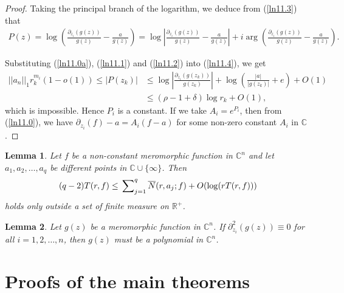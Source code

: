 \documentclass[11pt, reqno]{amsart}
\newtheorem*{cor A}{Corollary A}
\newtheorem*{cor B}{Corollary B}
\newtheorem{lem}{Lemma}[section]
\newcommand{\ol}{\overline}
\numberwithin{equation}{section}
\begin{document}
\begin{proof}
Taking the principal branch of the logarithm, we deduce from (\ref{ln11.3}) that
\begin{align}\label{ln11.4}
P(z)=\log \left( \frac{\partial_{z_i}(g(z))}{g(z)} - \frac{a}{g(z)} \right)
=\log \left| \frac{\partial_{z_i}(g(z))}{g(z)}-\frac{a}{g(z)}\right|+ i\arg \left(\frac{\partial_{z_i}(g(z))}{g(z)}-\frac{a}{g(z)}\right).
\end{align}

Substituting (\ref{ln11.0a}), (\ref{ln11.1}) and (\ref{ln11.2}) into (\ref{ln11.4}), we get
\begin{align*} ||a_n||_1 r_k^{m_i}(1 - o(1))\leq |P(z_k)|&\leq \log \left|\frac{\partial_{z_i}(g(z_k))}{g(z_k)}\right|+\log \left(\frac{|a|}{|g(z_k)|}+e\right)+O(1)\\&\leq (\rho-1+\delta)\log r_k+O(1),
\end{align*}
which is impossible. Hence $P_i$ is a constant. If we take $A_i=e^{P_i}$, then from (\ref{ln11.0}), we have $\partial_{z_i}(f)-a=A_i(f-a)$ for some non-zero constant $A_i$ in $\mathbb{C}$.
\end{proof}

\begin{lem}\label{ln2.5}\cite[Lemma 1.2]{Hu-Yang-1996} Let $f$ be a non-constant meromorphic function in $\mathbb{C}^n$ and let $a_1,a_2,\ldots,a_q$ be different points in $\mathbb{C}\cup\{\infty\}$. Then
\begin{align*}
(q-2)T(r,f)\leq \sideset{}{_{j=1}^{q}}{\sum} \ol N(r,a_j;f)+O(\log (rT(r,f)))
\end{align*}
holds only outside a set of finite measure on $\mathbb{R}^+$.
\end{lem}

\begin{lem}\label{ln2.12}\cite{Majumder-Sarkar-2027} Let $g(z)$ be a meromorphic function in $\mathbb{C}^n$. If $\partial^2_{z_i}(g(z))\equiv 0$ for all $i=1,2,\ldots,n$, then $g(z)$ must be a polynomial in $\mathbb{C}^n$.
\end{lem}





\section{\bf{Proofs of the main theorems}}
\end{document}
